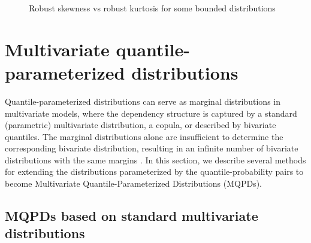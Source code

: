 \documentclass[
  fleqn,
  deca,
  blindrev
]{informs4}
\begin{document}
\begin{figure}


\caption{\label{fig-bounded}Robust skewness vs robust kurtosis for some
bounded distributions}

\end{figure}%

\section{Multivariate quantile-parameterized
distributions}\label{sec-multivariateqpd}

Quantile-parameterized distributions can serve as marginal distributions
in multivariate models, where the dependency structure is captured by a
standard (parametric) multivariate distribution, a copula, or described
by bivariate quantiles. The marginal distributions alone are
insufficient to determine the corresponding bivariate distribution,
resulting in an infinite number of bivariate distributions with the same
margins
\citep{gumbel1960BivariateExponentialDistributions, gumbel1961BivariateLogisticDistributions}.
In this section, we describe several methods for extending the
distributions parameterized by the quantile-probability pairs to become
Multivariate Quantile-Parameterized Distributions (MQPDs).

\subsection{MQPDs based on standard multivariate
distributions}\label{mqpds-based-on-standard-multivariate-distributions}
\end{document}
